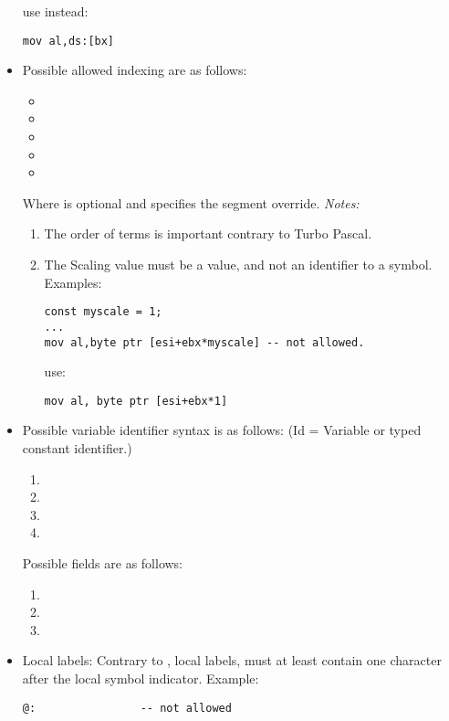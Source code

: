 \begin{itemize}
use instead:
\begin{verbatim}
mov al,ds:[bx]
\end{verbatim}
\item Possible allowed indexing are as follows:
\begin{itemize}
\item {}
\item {}
\item {}
\item {}
\item {}
\end{itemize}
Where  is optional and specifies the segment override.
{\em Notes:}
\begin{enumerate}
\item The order of terms is important contrary to Turbo Pascal.
\item The Scaling value must be a value, and not an identifier
to a symbol. Examples:
\begin{verbatim}
const myscale = 1;
...
mov al,byte ptr [esi+ebx*myscale] -- not allowed.
\end{verbatim}
use:
\begin{verbatim}
mov al, byte ptr [esi+ebx*1]
\end{verbatim}
\end{enumerate}
\item Possible variable identifier syntax is as follows:
(Id = Variable or typed constant identifier.)
\begin{enumerate}
\item {}
\item \var{[ID]}
\item \var{[ID+expr]}
\item {}
\end{enumerate}
 Possible fields are as follows:
\begin{enumerate}
\item {}
\item {}
\item {}
\end{enumerate}
\item Local labels: Contrary to \tp, local labels, must
at least contain one character after the local symbol indicator.
Example:
\begin{verbatim}
@:                -- not allowed

\end{verbatim}
\end{itemize}
